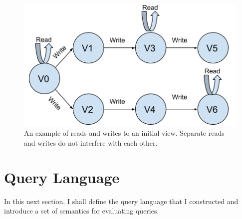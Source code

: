 \documentclass[12pt,a4paper,twoside,openright]{report}
\begin{document}
\begin{figure}[ht]
\begin{center}
  \includegraphics[width=\textwidth]{figs/readsWrites2.png}
  \caption{An example of reads and writes to an initial view. Separate reads and writes do not interfere with each other.}

\end{center}
  \label{fig:ReadsWrites}
\end{figure}

\section{Query Language}

In this next section, I shall define the query language that I constructed and introduce a set of semantics for evaluating queries.
\end{document}
